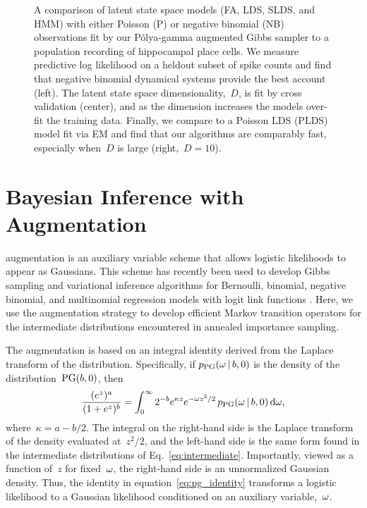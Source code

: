 \begin{figure}
  {A comparison of latent state space models (FA, LDS, SLDS,
    and HMM) with either Poisson (P) or negative binomial (NB)
    observations fit by our P\'{o}lya-gamma augmented Gibbs sampler to
    a population recording of hippocampal place cells. We measure
    predictive log likelihood on a heldout subset of spike counts and
    find that negative binomial dynamical systems provide the best
    account (left). The latent state space dimensionality,~$D$, is fit
    by cross validation (center), and as the dimension increases the
    models over-fit the training data. Finally, we compare to a
    Poisson LDS (PLDS) model fit via EM and find that our algorithms
    are comparably fast, especially when~$D$ is large
    (right,~$D=10$).}
  \label{fig:hipp}
\end{figure}


\section{Bayesian Inference with \polyagamma Augmentation}
\polyagamma augmentation is an auxiliary variable scheme that allows
logistic likelihoods to appear as Gaussians.  This
scheme has recently been used to develop Gibbs sampling and
variational inference algorithms for Bernoulli, binomial, 
negative binomial, and multinomial regression models
with logit link functions \citep{polson2013bayesian}.
Here, we use the augmentation strategy to
develop efficient Markov transition operators for the 
intermediate distributions encountered in annealed importance sampling.

The \polyagamma augmentation is based on an integral identity
derived from the Laplace transform of the \polyagamma distribution. 
Specifically, if $p_{\mathrm{PG}}({\omega}\,|\, b, 0)$ is the density of
the \polyagamma distribution~${\mathrm{PG}(b, 0)}$, then
\begin{equation}
\frac{(e^{z})^a}{(1+e^{z})^b} = \int_{0}^{\infty} 2^{-b} e^{\kappa z}  e^{-{\omega} z^2 /2} \, p_{\mathrm{PG}}({\omega} \,|\, b, 0) \, \mathrm{d}{\omega},
\label{eq:pg_identity}
\end{equation}
where~${\kappa=a-b/2}$. The integral on the right-hand side is the
Laplace transform of the \polyagamma density evaluated at~$z^2/2$,
and the left-hand side is the same form found in
the intermediate distributions of Eq.~\ref{eq:intermediate}.  Importantly, viewed as a function of~$z$ for
fixed~${\omega}$, the right-hand side is an unnormalized Gaussian
density.  Thus, the identity in equation~\ref{eq:pg_identity}
transforms a logistic likelihood to a Gaussian likelihood conditioned on an
auxiliary variable,~${\omega}$. 

